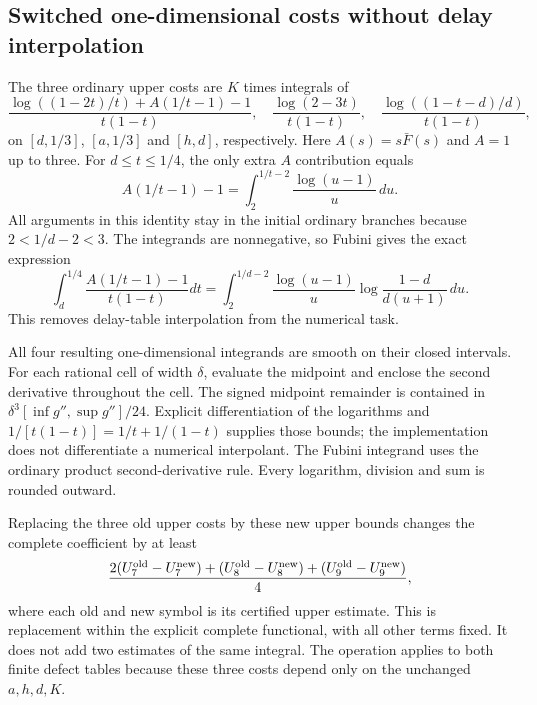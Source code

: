\subsection{Switched one-dimensional costs without delay interpolation}
The three ordinary upper costs are $K$ times integrals of
\[
 \frac{\log((1-2t)/t)+A(1/t-1)-1}{t(1-t)},\quad
 \frac{\log(2-3t)}{t(1-t)},\quad
 \frac{\log((1-t-d)/d)}{t(1-t)},
\]
on $[d,1/3]$, $[a,1/3]$ and $[h,d]$, respectively.
Here $A(s)=s\bar F(s)$ and $A=1$ up to three.
For $d\le t\le1/4$, the only extra $A$ contribution equals
\[
 A(1/t-1)-1=\int_2^{1/t-2}\frac{\log(u-1)}u\,du.
\]
All arguments in this identity stay in the initial ordinary branches
because $2<1/d-2<3$. The integrands are nonnegative, so Fubini gives
the exact expression
\[
 \int_d^{1/4}\frac{A(1/t-1)-1}{t(1-t)}dt
 =\int_2^{1/d-2}\frac{\log(u-1)}u
     \log\frac{1-d}{d(u+1)}\,du.
\]
This removes delay-table interpolation from the numerical task.

All four resulting one-dimensional integrands are smooth on their
closed intervals. For each rational cell of width $\delta$, evaluate
the midpoint and enclose the second derivative throughout the cell.
The signed midpoint remainder is contained in
$\delta^3[\inf g'',\sup g'']/24$. Explicit differentiation of the
logarithms and $1/[t(1-t)]=1/t+1/(1-t)$ supplies those bounds;
the implementation does not differentiate a numerical interpolant.
The Fubini integrand uses the ordinary product second-derivative rule.
Every logarithm, division and sum is rounded outward.

Replacing the three old upper costs by these new upper bounds changes
the complete coefficient by at least
\[
 \frac{2(U_7^{\rm old}-U_7^{\rm new})+
 (U_8^{\rm old}-U_8^{\rm new})+(U_9^{\rm old}-U_9^{\rm new})}{4},
\]
where each old and new symbol is its certified upper estimate.
This is replacement within the explicit complete functional, with
all other terms fixed. It does not add two estimates of the same
integral. The operation applies to both finite defect tables because
these three costs depend only on the unchanged $a,h,d,K$.
